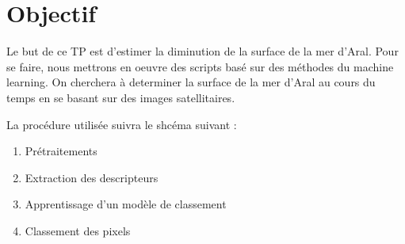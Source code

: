 \section{Objectif}

Le but de ce TP est d'estimer la diminution de la surface de la mer d'Aral. Pour se faire, nous mettrons en oeuvre
des scripts basé sur des méthodes du machine learning. On cherchera à determiner la surface de la mer d'Aral au cours
du temps en se basant sur des images satellitaires. 

La procédure utilisée suivra le shcéma suivant :


\begin{enumerate}
    \item Prétraitements
    \item Extraction des descripteurs
    \item Apprentissage d’un modèle de classement
    \item Classement des pixels
\end{enumerate}



